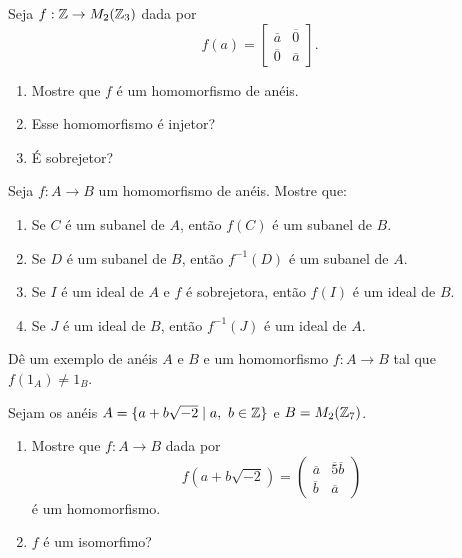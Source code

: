 \documentclass[12pt]{exam}
\begin{document}
    \vspace{.3cm}

    \questao{} Seja $f : \mathbb{Z} \to M_2(\mathbb{Z}_3)$ dada por
    \[
        f(a) = \begin{bmatrix}
            \overline{a} & \overline{0}\\
            \overline{0} & \overline{a}
        \end{bmatrix}.
    \]
    \begin{enumerate}[label=({\alph*})]
        \item Mostre que $f$ \'e um homomorfismo de an\'eis.

        \item Esse homomorfismo \'e injetor?

        \item \'E sobrejetor?
    \end{enumerate}

    \vspace{.3cm}

    \questao{} Seja $f: A \to B$ um homomorfismo de an{\'e}is. Mostre que:
    \begin{enumerate}[label=({\alph*})]
        \item Se $C$  {\'e} um subanel de $A$, ent{\~a}o $f(C)$ {\'e} um subanel de $B$.

        \item Se $D$ {\'e} um subanel de $B$, ent{\~a}o $f^{-1}(D)$ {\'e} um subanel de $A$.

        \item Se $I$ {\'e} um ideal de $A$ e $f$ \'e sobrejetora, ent{\~a}o $f(I)$ {\'e} um ideal de $B$.

        \item Se $J$ {\'e} um ideal de $B$, ent{\~a}o $f^{-1}(J)$ {\'e} um ideal de $A$.
    \end{enumerate}

    \vspace{.3cm}

    \questao{} D{\^e} um exemplo de an{\'e}is $A$ e $B$ e um homomorfismo $f : A \to B$ tal que $f(1_A) \ne 1_B$.

    \vspace{.3cm}

    \questao{} Sejam os an{\'e}is $A = \{ a + b\sqrt{-2} \mid a,\ b \in \mathbb{Z}\}$ e $B = M_2(\mathbb{Z}_7)$.
    \begin{enumerate}[label=({\alph*})]
        \item Mostre que $f : A \to B$ dada por
        \[
        f(a + b\sqrt{-2}) =
        \begin{pmatrix}
        \overline{a} & \overline{5}\overline{b}\\
        \overline{b} & \overline{a}
        \end{pmatrix}
        \]
        {\'e} um homomorfismo.

        \item $f$ {\'e} um isomorfimo?
    \end{enumerate}
\end{document}
